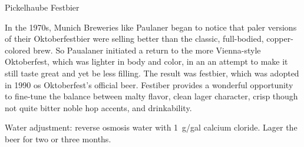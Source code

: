 \stylesection{\styleoktoberfest}

\begin{recipie}{Pickelhaube Festbier}

\begin{aboutblock}
In the 1970s, Munich Breweries like Paulaner began to notice that paler
versions of their Oktoberfestbier were selling better than the classic,
full-bodied, copper-colored brew. So Paualaner initiated a return to the
more Vienna-style Oktoberfest, which was lighter in body and color, in
an an attempt to make it still taste great and yet be less filling. The
result was festbier, which was adopted in 1990 os Oktoberfest's official
beer.  Festiber provides a wonderful opportunity to fine-tune the balance
between malty flavor, clean lager character, crisp though not quite bitter
noble hop accents, and drinkability.
\end{aboutblock}


\begin{methodandtiming}
 
\begin{mashsteps}
\end{mashsteps}

\begin{fermentationsteps}
\end{fermentationsteps}

\begin{directions}
Water adjustment: reverse osmosis water with 1~g/gal calcium cloride. Lager the beer
for two or three months.
\end{directions}

\end{methodandtiming}

\begin{ingredientsblock}

\begin{malts}
\end{malts}

\begin{hops}
\end{hops}

\begin{yeasts}
\end{yeasts}

\end{ingredientsblock}

\end{recipie}
